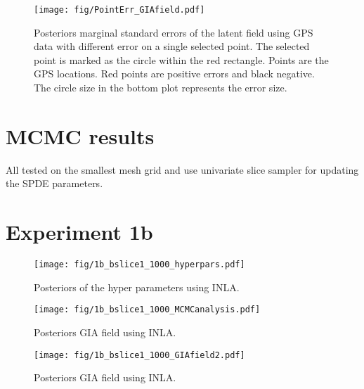 \documentclass[a4paper,12pt]{article}
\begin{document}
 \begin{figure}[htbp]
 \begin{center}
 \texttt{[image: fig/PointErr\_GIAfield.pdf]}
 \end{center}
 \caption[Posterior marginal standard errors of the latent field]{Posteriors marginal standard errors of the latent field using GPS data with different error on a single selected point. The selected point is marked as the circle within the red rectangle. Points are the GPS locations. Red points are positive errors and black negative. The circle size in the bottom plot represents the error size.}
 \label{fig:6}
 \end{figure}
 
 

\section{MCMC results}

All tested on the smallest mesh grid and use univariate slice sampler for updating the SPDE parameters.





\section{Experiment 1b}


\begin{figure}[htbp]
 \begin{center}
 \texttt{[image: fig/1b\_bslice1\_1000\_hyperpars.pdf]}
 \end{center}
 \caption[Posterior hyper parameters]{Posteriors of the hyper parameters using INLA.}
 \label{fig:5}
 \end{figure}

\begin{figure}[htbp]
 \begin{center}
 \texttt{[image: fig/1b\_bslice1\_1000\_MCMCanalysis.pdf]}
 \end{center}
 \caption[Posterior field]{Posteriors GIA field using INLA.}
 \label{fig:5}
 \end{figure}

\begin{figure}[htbp]
 \begin{center}
 \texttt{[image: fig/1b\_bslice1\_1000\_GIAfield2.pdf]}
 \end{center}
 \caption[Posterior field]{Posteriors GIA field using INLA.}
 \label{fig:5}
 \end{figure}
 
 
 
 


%
\end{document}
